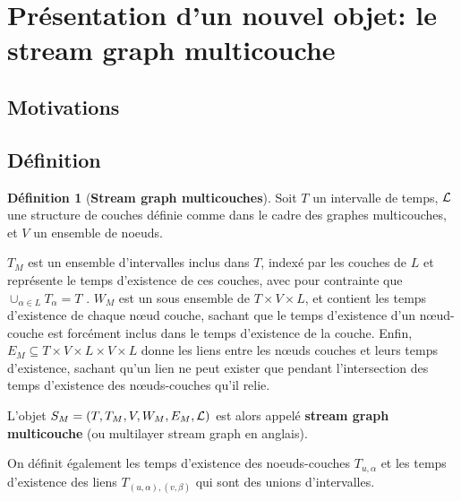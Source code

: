 \documentclass[11pt,a4paper]{article}
\theoremstyle{definition}
\newtheorem{defn}{Définition}
\theoremstyle{remark}
\theoremstyle{remark}
\def \stgm {stream graph multicouche}
\def \Stgm {Stream graph multicouches}
\begin{document}

 
\section{Présentation d'un nouvel objet: le stream graph multicouche}



\subsection{Motivations}
\subsection{Définition}

\begin{defn}[\textbf{\Stgm}]
    
    Soit $T$ un intervalle de temps, ${\cal L}$ une structure de couches définie comme dans le cadre des graphes multicouches, et $V$ un ensemble de noeuds. 
    
    $T_M$ est un ensemble d'intervalles inclus dans $T$, indexé par les couches de $L$ et représente le temps d'existence de ces couches, avec pour contrainte que $\cup_{\alpha \in L} T_{\alpha} = T$ . $W_M$ est un sous ensemble de $T \times V \times L$, et contient les temps d'existence de chaque nœud couche, sachant que le temps d'existence d'un nœud-couche est forcément inclus dans le temps d'existence de la couche. Enfin, $E_M \subseteq T \times V \times L \times V \times L$ donne les liens entre les nœuds couches et leurs temps d'existence, sachant qu'un lien ne peut exister que pendant l'intersection des temps d'existence des nœuds-couches qu'il relie.
    
    L'objet $S_M = (T,T_M,V,W_M,E_M,{\cal L})$ est alors appelé \textbf{\stgm } (ou multilayer stream graph en anglais).
    
    On définit également les temps d'existence des noeuds-couches $T_{u,\alpha}$ et les temps d'existence des liens $T_{(u,\alpha),(v,\beta)}$ qui sont des unions d'intervalles.
	\end{defn}
	
\end{document}
